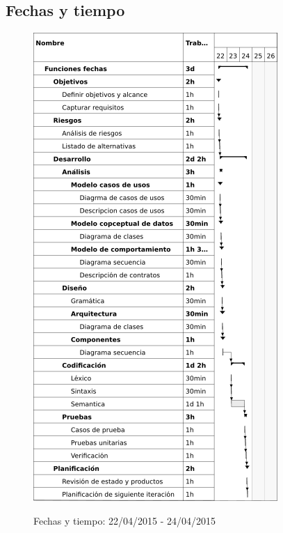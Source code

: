 \subsection{Fechas y tiempo}
\begin{center}
\begin{figure}[H]
\centering
\includegraphics[scale=1]{planning/23-funciones-fechas.png} \\
\caption{Fechas y tiempo: 22/04/2015 - 24/04/2015 }
\end{figure}
\end{center}

